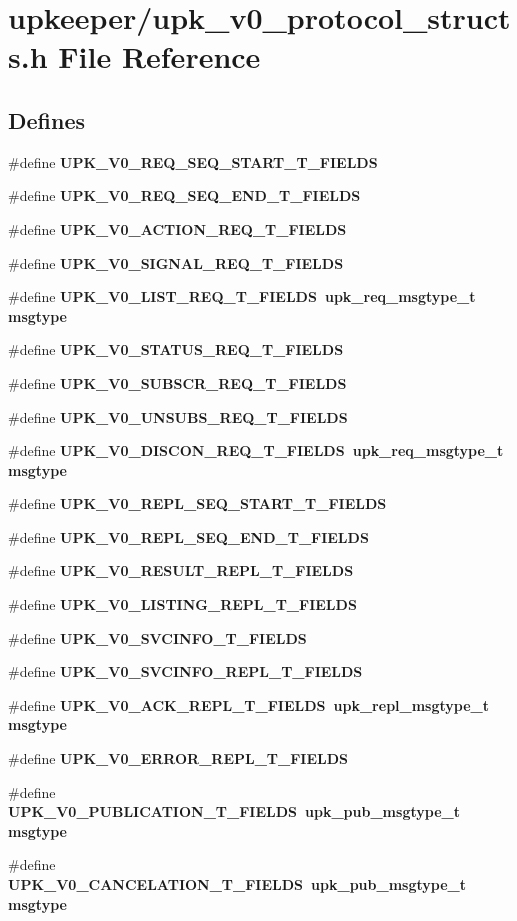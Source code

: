 \section{upkeeper/upk\_\-v0\_\-protocol\_\-structs.h File Reference}
\label{upk__v0__protocol__structs_8h}
\subsection*{Defines}
\begin{CompactItemize}
\item 
\#define \bf{UPK\_\-V0\_\-REQ\_\-SEQ\_\-START\_\-T\_\-FIELDS}
\item 
\#define \bf{UPK\_\-V0\_\-REQ\_\-SEQ\_\-END\_\-T\_\-FIELDS}
\item 
\#define \bf{UPK\_\-V0\_\-ACTION\_\-REQ\_\-T\_\-FIELDS}
\item 
\#define \bf{UPK\_\-V0\_\-SIGNAL\_\-REQ\_\-T\_\-FIELDS}
\item 
\#define \bf{UPK\_\-V0\_\-LIST\_\-REQ\_\-T\_\-FIELDS}~\bf{upk\_\-req\_\-msgtype\_\-t}       msgtype
\item 
\#define \bf{UPK\_\-V0\_\-STATUS\_\-REQ\_\-T\_\-FIELDS}
\item 
\#define \bf{UPK\_\-V0\_\-SUBSCR\_\-REQ\_\-T\_\-FIELDS}
\item 
\#define \bf{UPK\_\-V0\_\-UNSUBS\_\-REQ\_\-T\_\-FIELDS}
\item 
\#define \bf{UPK\_\-V0\_\-DISCON\_\-REQ\_\-T\_\-FIELDS}~\bf{upk\_\-req\_\-msgtype\_\-t}       msgtype
\item 
\#define \bf{UPK\_\-V0\_\-REPL\_\-SEQ\_\-START\_\-T\_\-FIELDS}
\item 
\#define \bf{UPK\_\-V0\_\-REPL\_\-SEQ\_\-END\_\-T\_\-FIELDS}
\item 
\#define \bf{UPK\_\-V0\_\-RESULT\_\-REPL\_\-T\_\-FIELDS}
\item 
\#define \bf{UPK\_\-V0\_\-LISTING\_\-REPL\_\-T\_\-FIELDS}
\item 
\#define \bf{UPK\_\-V0\_\-SVCINFO\_\-T\_\-FIELDS}
\item 
\#define \bf{UPK\_\-V0\_\-SVCINFO\_\-REPL\_\-T\_\-FIELDS}
\item 
\#define \bf{UPK\_\-V0\_\-ACK\_\-REPL\_\-T\_\-FIELDS}~\bf{upk\_\-repl\_\-msgtype\_\-t}      msgtype
\item 
\#define \bf{UPK\_\-V0\_\-ERROR\_\-REPL\_\-T\_\-FIELDS}
\item 
\#define \bf{UPK\_\-V0\_\-PUBLICATION\_\-T\_\-FIELDS}~\bf{upk\_\-pub\_\-msgtype\_\-t}       msgtype
\item 
\#define \bf{UPK\_\-V0\_\-CANCELATION\_\-T\_\-FIELDS}~\bf{upk\_\-pub\_\-msgtype\_\-t}       msgtype
\end{CompactItemize}


